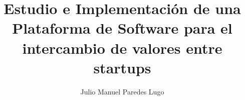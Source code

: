 \documentclass[12pt,oneside]{book}
\begin{document}
\frontmatter


\logoarriba{}




\title{Estudio e Implementación de una Plataforma de Software para el intercambio de valores entre startups}

\author{Julio Manuel Paredes Lugo}





\end{document}
